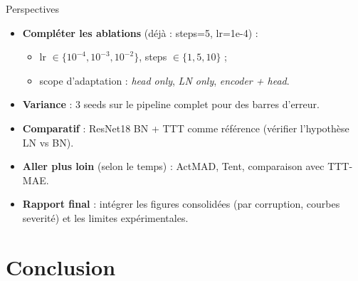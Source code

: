 \documentclass[10pt,aspectratio=169]{beamer}
\begin{document}
\begin{frame}{Perspectives}
  \begin{itemize}
    \item \textbf{Compléter les ablations} (déjà : steps=5, lr=1e-4) :
    \begin{itemize}\small
      \item lr $\in \{10^{-4}, 10^{-3}, 10^{-2}\}$, steps $\in \{1, 5, 10\}$ ;
      \item scope d'adaptation : \emph{head only}, \emph{LN only}, \emph{encoder + head}.
    \end{itemize}
    \item \textbf{Variance} : 3 seeds sur le pipeline complet pour des barres d'erreur.
    \item \textbf{Comparatif} : ResNet18 BN + TTT comme référence (vérifier l'hypothèse LN vs BN).
    \item \textbf{Aller plus loin} (selon le temps) : ActMAD, Tent, comparaison avec TTT-MAE.
    \item \textbf{Rapport final} : intégrer les figures consolidées (par corruption, courbes severité) et les limites expérimentales.
  \end{itemize}
\end{frame}

\section{Conclusion}
\end{document}
